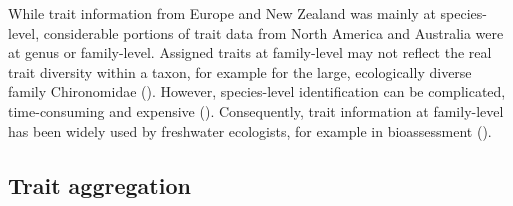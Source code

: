 \documentclass{article}
\begin{document}
While trait information from Europe and New Zealand was mainly at species-level, considerable portions of trait data from North America and Australia were at genus or family-level. Assigned traits at family-level may not reflect the real trait diversity within a taxon, for example for the large, ecologically diverse family Chironomidae (\cite{serra_synthesising_2016}). However, species-level identification can be complicated, time-consuming and expensive (\cite{marshall_taxonomic_2006, resh_which_2008}). Consequently, trait information at family-level has been widely used by freshwater ecologists, for example in bioassessment (\cite{beketov_spear_2009}).


\subsection*{Trait aggregation}
\end{document}
